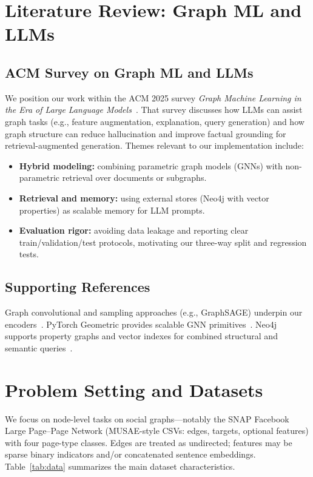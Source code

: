 \documentclass[conference]{IEEEtran}
\begin{document}
\section{Literature Review: Graph ML and LLMs}

\subsection{ACM Survey on Graph ML and LLMs}

We position our work within the ACM 2025 survey \emph{Graph Machine Learning in the Era of Large Language Models}~\cite{acm_survey_gml_llm}. That survey discusses how LLMs can assist graph tasks (e.g., feature augmentation, explanation, query generation) and how graph structure can reduce hallucination and improve factual grounding for retrieval-augmented generation. Themes relevant to our implementation include:

\begin{itemize}
  \item \textbf{Hybrid modeling:} combining parametric graph models (GNNs) with non-parametric retrieval over documents or subgraphs.
  \item \textbf{Retrieval and memory:} using external stores (Neo4j with vector properties) as scalable memory for LLM prompts.
  \item \textbf{Evaluation rigor:} avoiding data leakage and reporting clear train/validation/test protocols, motivating our three-way split and regression tests.
\end{itemize}

\subsection{Supporting References}

Graph convolutional and sampling approaches (e.g., GraphSAGE) underpin our encoders~\cite{hamilton2017graphsage}. PyTorch Geometric provides scalable GNN primitives~\cite{pyg}. Neo4j supports property graphs and vector indexes for combined structural and semantic queries~\cite{neo4j_vector}.

\section{Problem Setting and Datasets}

We focus on node-level tasks on social graphs---notably the SNAP Facebook Large Page--Page Network (MUSAE-style CSVs: edges, targets, optional features) with four page-type classes. Edges are treated as undirected; features may be sparse binary indicators and/or concatenated sentence embeddings. Table~\ref{tab:data} summarizes the main dataset characteristics.
\end{document}

